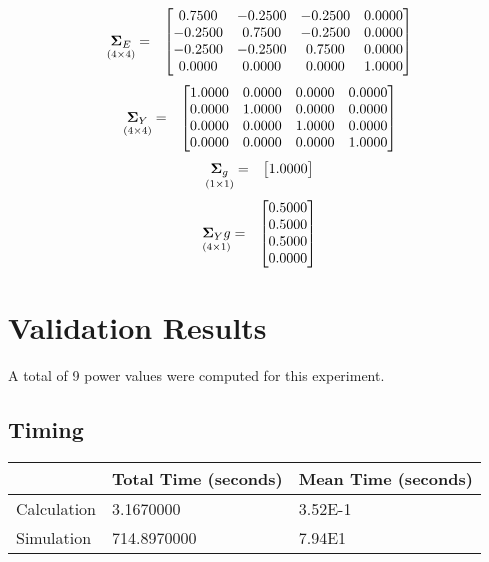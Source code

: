 \documentclass{glimmpse-report}
\begin{document}
\begin{eqnarray*}
\underset{\left(4\times4\right)}{\mathbf{\Sigma}_E} & = & \begin{bmatrix}0.7500 & -0.2500 & -0.2500 & 0.0000\protect\\
-0.2500 & 0.7500 & -0.2500 & 0.0000\protect\\
-0.2500 & -0.2500 & 0.7500 & 0.0000\protect\\
0.0000 & 0.0000 & 0.0000 & 1.0000\protect\\
\end{bmatrix}
\end{eqnarray*}
\begin{eqnarray*}
\underset{\left(4\times4\right)}{\mathbf{\Sigma}_Y} & = & \begin{bmatrix}1.0000 & 0.0000 & 0.0000 & 0.0000\protect\\
0.0000 & 1.0000 & 0.0000 & 0.0000\protect\\
0.0000 & 0.0000 & 1.0000 & 0.0000\protect\\
0.0000 & 0.0000 & 0.0000 & 1.0000\protect\\
\end{bmatrix}
\end{eqnarray*}
\begin{eqnarray*}
\underset{\left(1\times1\right)}{\mathbf{\Sigma}_g} & = & \begin{bmatrix}1.0000\protect\\
\end{bmatrix}
\end{eqnarray*}
\begin{eqnarray*}
\underset{\left(4\times1\right)}{\mathbf{\Sigma}_Yg} & = & \begin{bmatrix}0.5000\protect\\
0.5000\protect\\
0.5000\protect\\
0.0000\protect\\
\end{bmatrix}
\end{eqnarray*}
\section{Validation Results}
A total of 9 power values were computed for this experiment.

\subsection{Timing}
\begin{tabular}{|l|l|l|}
\hline
 & Total Time (seconds) & Mean Time (seconds) \\ 
\hline
Calculation & 3.1670000 & 3.52E-1\tabularnewline
\hline
Simulation & 714.8970000 & 7.94E1\tabularnewline
\hline
\end{tabular}
\end{document}
